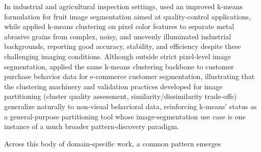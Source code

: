In industrial and agricultural inspection settings, \cite{wang2016method} used an improved k-means formulation for fruit image segmentation aimed at quality-control applications, while \cite{zhang2023metal} applied k-means clustering on pixel color features to separate metal abrasive grains from complex, noisy, and unevenly illuminated industrial backgrounds, reporting good accuracy, stability, and efficiency despite these challenging imaging conditions. Although outside strict pixel-level image segmentation, \cite{tabianan2022means} applied the same k-means clustering backbone to customer purchase behavior data for e-commerce customer segmentation, illustrating that the clustering machinery and validation practices developed for image partitioning (cluster quality assessment, similarity/dissimilarity trade-offs) generalize naturally to non-visual behavioral data, reinforcing k-means' status as a general-purpose partitioning tool whose image-segmentation use case is one instance of a much broader pattern-discovery paradigm.

Across this body of domain-specific work, a common pattern emerges

